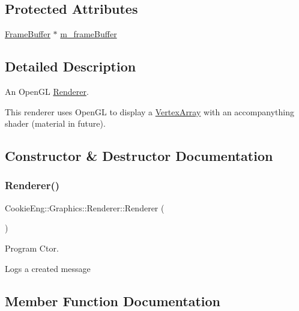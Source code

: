\subsection*{Protected Attributes}
\begin{DoxyCompactItemize}
\item 
\hyperlink{class_cookie_eng_1_1_graphics_1_1_frame_buffer}{Frame\+Buffer} $\ast$ \hyperlink{class_cookie_eng_1_1_graphics_1_1_renderer_a64f992d6d2476fe2ea641f31a46f006e}{m\+\_\+frame\+Buffer}
\end{DoxyCompactItemize}


\subsection{Detailed Description}
An Open\+GL \hyperlink{class_cookie_eng_1_1_graphics_1_1_renderer}{Renderer}. 

This renderer uses Open\+GL to display a \hyperlink{class_cookie_eng_1_1_graphics_1_1_vertex_array}{Vertex\+Array} with an accompanything shader (material in future). 

\subsection{Constructor \& Destructor Documentation}
\mbox{\label{class_cookie_eng_1_1_graphics_1_1_renderer_a255e78964e0d0ff7efd26e60a6612f39}} 
\subsubsection{\texorpdfstring{Renderer()}{Renderer()}}
{\footnotesize\ttfamily Cookie\+Eng\+::\+Graphics\+::\+Renderer\+::\+Renderer (\begin{DoxyParamCaption}{ }\end{DoxyParamCaption})}



Program Ctor. 

Logs a created message 

\subsection{Member Function Documentation}
\mbox{\label{class_cookie_eng_1_1_graphics_1_1_renderer_a5cadfbd80259f0188e52880c47ac7573}} 
